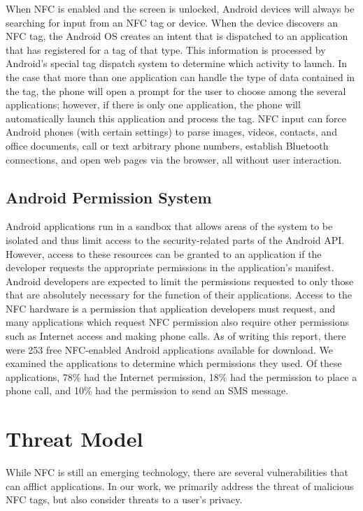 \documentclass[12pt]{article}
\begin{document}
When NFC is enabled and the screen is unlocked, Android devices will always be searching for input from an NFC tag or device. 
When the device discovers an NFC tag, the Android OS creates an intent that is dispatched to an application that has registered for a tag of that type.
This information is processed by Android's special tag dispatch system to determine which activity to launch.
In the case that more than one application can handle the type of data contained in the tag, the phone will open a prompt for the user to choose among the several applications; however, if there is only one application, the phone will automatically launch this application and process the tag.
NFC input can force Android phones (with certain settings) to parse images, videos, contacts, and office documents, call or text arbitrary phone numbers, establish Bluetooth connections, and open web pages via the browser, all without user interaction.  

\subsection{Android Permission System}
\label{sec:androidperm}
Android applications run in a sandbox that allows areas of the system to be isolated and thus limit access to the security-related parts of the Android API.
However, access to these resources can be granted to an application if the developer requests the appropriate permissions in the application's manifest.
Android developers are expected to limit the permissions requested to only those that are absolutely necessary for the function of their applications.
Access to the NFC hardware is a permission that application developers must request, and many applications which request NFC permission also require other permissions such as Internet access and making phone calls.
As of writing this report, there were 253 free NFC-enabled Android applications available for download.
We examined the applications to determine which permissions they used.
Of these applications, 78\% had the Internet permission, 18\% had the permission to place a phone call, and 10\% had the permission to send an SMS message.

\section{Threat Model}
While NFC is still an emerging technology, there are several vulnerabilities that can afflict applications.
In our work, we primarily address the threat of malicious NFC tags, but also consider threats to a user's privacy. 
\end{document}
